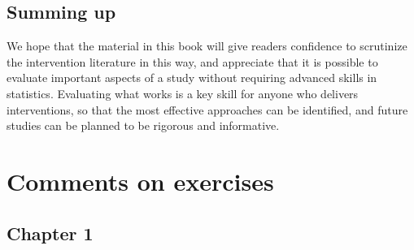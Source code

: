 \documentclass{krantz}
\begin{document}
\hypertarget{summing-up}{%
\section{Summing up}\label{summing-up}}

We hope that the material in this book will give readers confidence to scrutinize the intervention literature in this way, and appreciate that it is possible to evaluate important aspects of a study without requiring advanced skills in statistics. Evaluating what works is a key skill for anyone who delivers interventions, so that the most effective approaches can be identified, and future studies can be planned to be rigorous and informative.

\hypertarget{comments}{%
\chapter{Comments on exercises}\label{comments}}

\hypertarget{chapter-1}{%
\section{Chapter 1}\label{chapter-1}}
\end{document}
